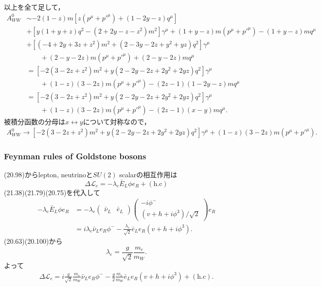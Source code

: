 以上を全て足して，
\begin{align*}
  A_{WW}^0 &\sim -2(1-z)m \left[ z(p^\mu+p'^\mu) + (1-2y-z) q^\mu \right] \\
  &+ [y (1+y+z) q^2 - (2+2y-z-z^2) m^2] \gamma^\mu + (1+y-z) m (p^\mu+p'^\mu) - (1+y-z)m q^\mu \\
  & + \left[ (-4+2y+3z+z^2)m^2 + (2-3y-2z+y^2+yz)q^2 \right] \gamma^\mu \\
  &\qquad + (2-y-2z)m (p^\mu+p'^\mu) + (2-y-2z)m q^\mu \\
  &= \left[-2(3-2z+z^2)m^2 + y(2-2y-2z+2y^2+2yz)q^2\right] \gamma^\mu \\
  &\qquad + (1-z)(3-2z)m (p^\mu+p'^\mu) - (2z-1)(1-2y-z) mq^\mu \\
  &= \left[-2(3-2z+z^2)m^2 + y(2-2y-2z+2y^2+2yz)q^2\right] \gamma^\mu \\
  &\qquad + (1-z)(3-2z)m (p^\mu+p'^\mu) - (2z-1)(x-y) mq^\mu .
\end{align*}
被積分函数の分母は\(x\leftrightarrow y\)について対称なので，
\begin{align}
  A_{WW}^0 \to \left[-2(3-2z+z^2)m^2 + y(2-2y-2z+2y^2+2yz)q^2\right] \gamma^\mu + (1-z)(3-2z)m (p^\mu+p'^\mu) .
  \label{problem21_1_A_WW}
\end{align}

\subsubsection{Feynman rules of Goldstone bosons}
(20.98)からlepton, neutrinoと\(SU(2)\) scalarの相互作用は
\[ \Delta\mathcal{L}_e = - \lambda_e \bar{E}_L \phi e_R + (\text{h.c}) \]
(21.38)(21.79)(20.75)を代入して
\begin{align*}
  - \lambda_e \bar{E}_L \phi e_R &= - \lambda_e
  \begin{pmatrix}
    \bar{\nu}_L & \bar{e}_L
  \end{pmatrix}
  \begin{pmatrix}
    -i \phi^- \\
    (v+h+i\phi^3)/\sqrt{2}
  \end{pmatrix}
  e_R \\
  &= i \lambda_e \bar{\nu}_L e_R \phi^- - \frac{\lambda_e}{\sqrt{2}} \bar{e}_L e_R (v+h+i\phi^3) .
\end{align*}
(20.63)(20.100)から
\[ \lambda_e = \frac{g}{\sqrt{2}} \frac{m_e}{m_W} . \]
よって
\begin{align}
  \Delta\mathcal{L}_e = i \frac{g}{\sqrt{2}} \frac{m_e}{m_W} \bar{\nu}_L e_R \phi^-
  - \frac{g}{2} \frac{m_e}{m_W} \bar{e}_L e_R (v+h+i\phi^3) + (\text{h.c}) .
  \label{problem21_1_Lag_e}
\end{align}

